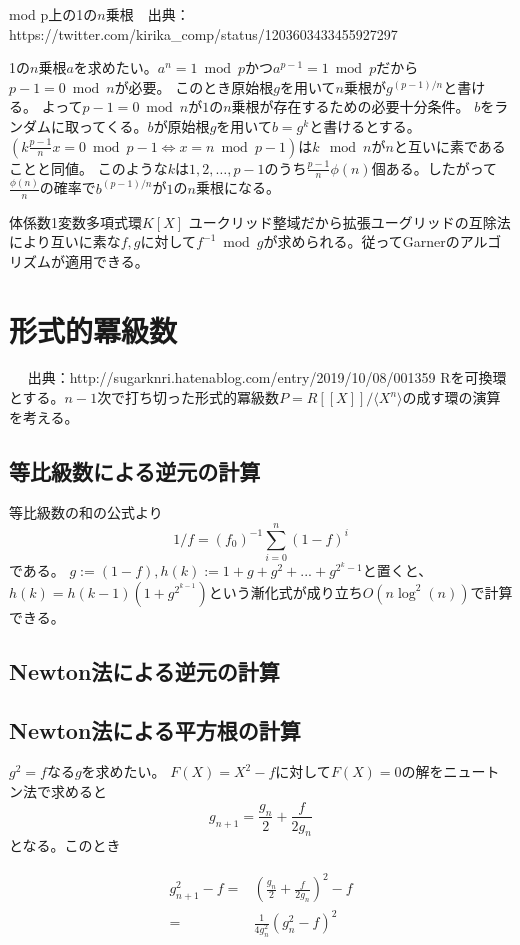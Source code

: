 \documentclass{jsarticle}
\begin{document}
mod p上の1の$n$乗根　出典：https://twitter.com/kirika\_comp/status/1203603433455927297

1の$n$乗根$a$を求めたい。$a^n=1 \bmod p$かつ$a^{p-1}=1\bmod p$だから$p-1 = 0 \bmod n $が必要。
このとき原始根$g$を用いて$n$乗根が$g^{(p-1)/n}$と書ける。
よって$p-1=0\bmod n$が$1$の$n$乗根が存在するための必要十分条件。
$b$をランダムに取ってくる。$b$が原始根$g$を用いて$b=g^k$と書けるとする。
$(k\frac{p-1}{n}x=0 \bmod p-1\Leftrightarrow x=n \bmod p-1)$は$k\mod n$が$n$と互いに素であることと同値。
このような$k$は$1,2,\ldots,p-1$のうち$\frac{p-1}{n}\phi(n)$個ある。したがって$\frac{\phi(n)}{n}$の確率で$b^{(p-1)/n}$が$1$の$n$乗根になる。

体係数1変数多項式環$K[X]$
ユークリッド整域だから拡張ユーグリッドの互除法により互いに素な$f,g$に対して$f^{-1} \bmod g$が求められる。従ってGarnerのアルゴリズムが適用できる。


\section{形式的冪級数}　
出典：http://sugarknri.hatenablog.com/entry/2019/10/08/001359
Rを可換環とする。$n-1$次で打ち切った形式的冪級数$P=R[[X]]/\langle X^{n} \rangle$の成す環の演算を考える。


\subsection{等比級数による逆元の計算}

等比級数の和の公式より
$$1/f=(f_0)^{-1}\sum_{i=0}^n(1-f)^i$$
である。
$g:=(1-f), h(k):=1+g+g^2+...+g^{2^{k}-1}$と置くと、
$h(k)=h(k-1)(1+g^{2^{k-1}})$という漸化式が成り立ち$O(n \log^2(n))$で計算できる。

\subsection{Newton法による逆元の計算}

\subsection{Newton法による平方根の計算}

$g^2=f $なる$g$を求めたい。
$F(X)=X^2-f$に対して$F(X)=0$の解をニュートン法で求めると
$$g_{n+1}=\frac{g_n}{2}+\frac{f}{2g_n}$$
となる。このとき

\begin{align}
  g_{n+1}^2-f=&(\frac{g_n}{2}+\frac{f}{2g_n})^2-f\\
  =&\frac{1}{4g_n^2}(g_n^2-f)^2\\
\end{align}
\end{document}
